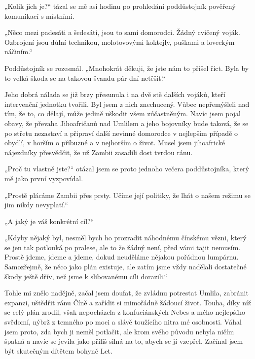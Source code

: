 \vspace{0.75cm}

„Kolik jich je?“ tázal se mě asi hodinu po prohledání poddůstojník pověřený komunikací s místními.

„Něco mezi padesáti a šedesáti, jsou to samí domorodci. Žádný cvičený voják. Ozbrojení jsou důlní technikou, molotovovými koktejly, puškami a loveckým náčiním.“

Poddůstojník se rozesmál. „Mnohokrát děkuji, že jste nám to přišel říct. Byla by to velká škoda se na takovou švandu pár dní netěšit.“   
 
Jeho dobrá nálada se již brzy přesunula i na dvě stě dalších vojáků, kteří intervenční jednotku tvořili. Byl jsem z nich znechucený. Vůbec nepřemýšleli nad tím, že to, co dělají, může jedině uškodit všem zúčastněným. Navíc jsem pojal obavy, že převaha Jihoafričanů nad Umlilem a jeho bojovníky bude taková, že se po střetu nezastaví a připraví další nevinné domorodce v nejlepším případě o obydlí, v horším o příbuzné a v nejhorším o život. Musel jsem jihoafrické nájezdníky přesvědčit, že už Zambii zasadili dost tvrdou ránu.
 
„Proč tu vlastně jste?“ otázal jsem se proto jednoho večera poddůstojníka, který mě jako první vyzpovídal.
 
„Prostě plácáme Zambii přes prsty. Učíme její politiky, že lhát o našem režimu se jim nikdy nevyplatí.“

„A jaký je váš konkrétní cíl?“

„Kdyby nějaký byl, nesměl bych ho prozradit náhodnému čínskému vězni, který se jen tak potlouká po pralese, ale to že žádný není, před vámi tajit nemusím. Prostě jdeme, jdeme a jdeme, dokud neuděláme nějakou pořádnou lumpárnu. Samozřejmě, že něco jako plán existuje, ale zatím jsme vždy nadělali dostatečné škody ještě dřív, než jsme k slibovanému cíli dorazili.“
 
Tohle mi znělo nadějně, začal jsem doufat, že zvládnu potrestat Umlila, zabránit expanzi, uštědřit ránu Číně a zařídit si mimořádně žádoucí život. Touha, díky níž se celý plán zrodil, však nepocházela z konfuciánských Nebes a mého nejlepšího svědomí, nýbrž z temného po moci a slávě toužícího nitra mé osobnosti. Váhal jsem proto, zda bych ji neměl potlačit, ale krom svého původu nebyla ničím špatná a navíc se jevila jako příliš silná na to, abych se jí vzepřel. Začínal jsem být skutečným dítětem bohyně Let.

\vspace{0.75cm}

